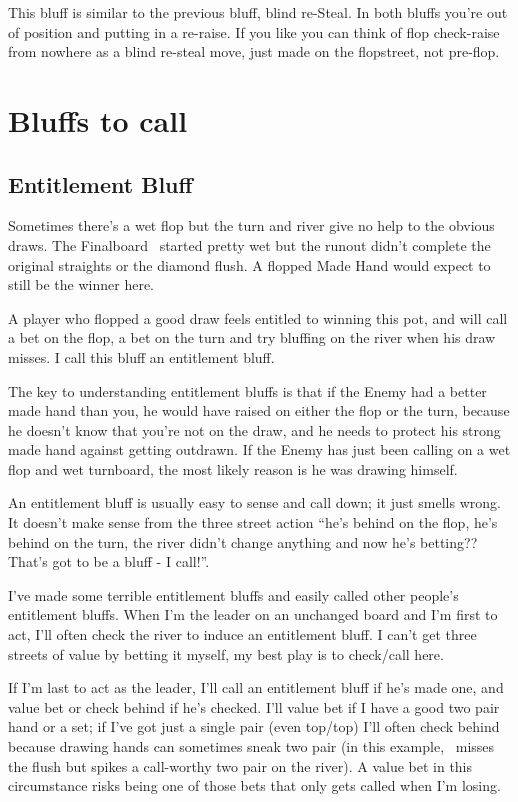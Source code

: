 This bluff is similar to the previous bluff, blind re-Steal. In both
bluffs you're out of position and putting in a re-raise. If you like
you can think of flop check-raise from nowhere as a blind re-steal
move, just made on the flopstreet, not pre-flop.

\section{Bluffs to call}
\subsection{Entitlement Bluff}

Sometimes there's a wet flop but the turn and river give no help
to the obvious draws. The Finalboard \Jd\tend\fivec\twoh\sixs\ started
pretty wet but the runout didn't complete the original straights or the
diamond flush. A flopped Made Hand would expect to still be the winner
here.

A player who flopped a good draw feels entitled to winning
this pot, and will call a bet on the flop, a bet on the turn
and try bluffing on the river when his draw misses. I call
this bluff an entitlement bluff.

The key to understanding entitlement bluffs is that if the Enemy had a
better made hand than you, he would have raised on either the flop or
the turn, because he doesn't know that you're not on the draw, and he
needs to protect his strong made hand against getting outdrawn. If the
Enemy has just been calling on a wet flop and wet turnboard, the most
likely reason is he was drawing himself.

An entitlement bluff is usually easy to sense and call down; it
just smells wrong. It doesn't make sense from the three street action
``he's behind on the flop, he's behind on the turn, the river
didn't change anything and now he's betting?? That's got to be
a bluff - I call!''.

I've made some terrible entitlement bluffs and easily called
other people's entitlement bluffs. When I'm the leader on
an unchanged board and I'm first to act, I'll often check the
river to induce an entitlement bluff. I can't get three streets
of value by betting it myself, my best play is to check/call here.

If I'm last to act as the leader, I'll call an entitlement bluff
if he's made one, and value bet or check behind if he's checked.
I'll value bet if I have a good two pair hand or a set; if I've
got just a single pair (even top/top) I'll often check behind
because drawing hands can sometimes sneak two pair (in this example,
\sixd\fived\ misses the flush but spikes a call-worthy two pair
on the river). A value bet in this circumstance risks being one
of those bets that only gets called when I'm losing.
